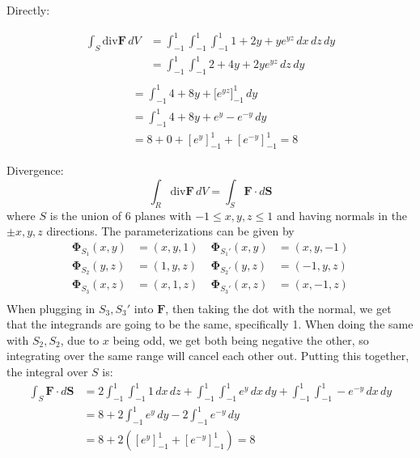 \documentclass{article}
\newcommand{\divt}{\text{div}}
\begin{document}
\begin{enumerate}
    Directly:
    \begin{multicols}{2}
    \noindent 
    \begin{align*}
        \int_S \divt \boldsymbol F \, dV &= \int_{-1}^1 \int_{-1}^1 \int_{-1}^1 1 + 2y + ye^{yz} \, dx \, dz \, dy \\
        &= \int_{-1}^1 \int_{-1}^1 2 + 4y + 2ye^{yz} \, dz \, dy \\
    \end{align*}
    \begin{align*}
        &= \int_{-1}^1 4 + 8y + \big[e^{yz}\big]_{-1}^1\, dy \\
        &= \int_{-1}^1 4 + 8y + e^y - e^{-y} \, dy \\
        &= 8 + 0 + [e^y]_{-1}^1 + [e^{-y}]_{-1}^1 = 8
    \end{align*}
    \end{multicols} 
    Divergence:
        \[\int_R \divt \boldsymbol F \, dV = \int_S \boldsymbol F \cdot d\boldsymbol S\]
        where $S$ is the union of 6 planes with $-1 \leq x,y,z \leq 1$ and having normals in the $\pm x,y,z$ directions.
        The parameterizations can be given by
        \begin{align*}
            \boldsymbol \Phi_{S_1} (x,y) &= (x,y,1)\; &\boldsymbol \Phi_{S_1'} (x,y) &= (x,y,-1)\\
            \boldsymbol \Phi_{S_2} (y,z) &= (1,y,z)\; &\boldsymbol \Phi_{S_2'} (y,z) &= (-1,y,z)\\
            \boldsymbol \Phi_{S_3} (x,z) &= (x,1,z)\; &\boldsymbol \Phi_{S_3'} (x,z) &= (x,-1,z)\\
        \end{align*}
        When plugging in $S_3,S_3'$ into $\boldsymbol F$, then taking the dot with the normal, we get that the integrands are going to be the same, specifically 1. When doing the same with $S_2,S_2$, due to $x$ being odd, we get both being negative the other, so integrating over the same range will cancel each other out. Putting this together, the integral over $S$ is:
        \begin{align*}
            \int_S \boldsymbol F \cdot d\boldsymbol S &= 2 \int_{-1}^{1} \int_{-1}^{1} 1 \, dx \, dz + \int_{-1}^{1} \int_{-1}^{1} e^y \, dx \, dy + \int_{-1}^{1}\int_{-1}^{1} - e^{-y} \,dx\, dy \\
            &= 8 + 2\int_{-1}^{1} e^y \, dy - 2 \int_{-1}^{1} e^{-y} \, dy \\
            &= 8 + 2([e^y]_{-1}^1 + [e^{-y}]_{-1}^1) = 8
        \end{align*}

\end{enumerate}
\end{document}
